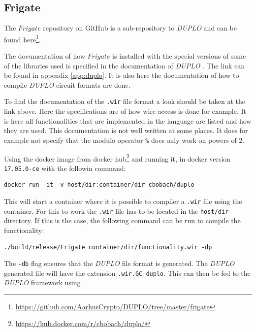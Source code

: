 \documentclass[twoside,11pt,openright]{report}
\newcommand{\DUPLO}{\textit{DUPLO} }
\begin{document}
\begin{appendices}
\section{Frigate}
\label{app:frigate}
The $Frigate$ repository on GitHub is a sub-repository to \DUPLO and can be found here\footnote{\url{https://github.com/AarhusCrypto/DUPLO/tree/master/frigate}}.

The documentation of how $Frigate$ is installed with the special versions of some of the libraries used is specified in the documentation of \DUPLO. The link can be found in appendix \ref{app:duplo}. It is also here the documentation of how to compile \DUPLO circuit formats are done.

To find the documentation of the \verb|.wir| file format a look should be taken at the link above. Here the specifications are of how wire access is done for example. It is here all functionalities that are implemented in the language are listed and how they are used. This documentation is not well written at some places. It does for example not specify that the modulo operator \verb|%| does only work on powers of $2$.

\bigskip

Using the docker image from docker hub\footnote{\url{https://hub.docker.com/r/cbobach/duplo/}} and running it, in docker version \verb|17.05.0-ce| with the followin command;

\begin{center}
\begin{verbatim}
docker run -it -v host/dir:container/dir cbobach/duplo
\end{verbatim}
\end{center}

This will start a container where it is possible to compiler a \verb|.wir| file using the container. For this to work the \verb|.wir| file has to be located in the \verb|host/dir| directory. If this is the case, the following command can be run to compile the functionality:

\begin{center}
\begin{verbatim}
./build/release/Frigate container/dir/functionality.wir -dp
\end{verbatim}
\end{center}

The \verb|-db| flag ensures that the \DUPLO file format is generated. The \DUPLO generated file will have the extension \verb|.wir.GC_duplo|. This can then be fed to the \DUPLO framework using


\end{appendices}
\end{document}
